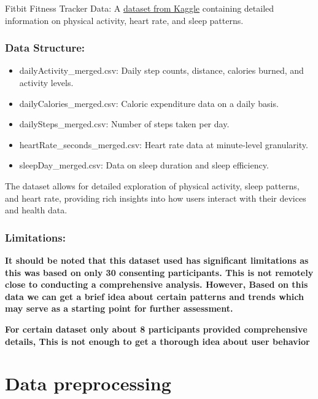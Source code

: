 \documentclass[
]{article}
\providecommand{\tightlist}{%
  \setlength{\itemsep}{0pt}\setlength{\parskip}{0pt}}
\begin{document}
Fitbit Fitness Tracker Data: A
\href{https://www.kaggle.com/datasets/arashnic/fitbit}{dataset from
Kaggle} containing detailed information on physical activity, heart
rate, and sleep patterns.

\hypertarget{data-structure}{%
\subsubsection{Data Structure:}\label{data-structure}}

\begin{itemize}
\tightlist
\item
  dailyActivity\_merged.csv: Daily step counts, distance, calories
  burned, and activity levels.
\item
  dailyCalories\_merged.csv: Caloric expenditure data on a daily basis.
\item
  dailySteps\_merged.csv: Number of steps taken per day.
\item
  heartRate\_seconds\_merged.csv: Heart rate data at minute-level
  granularity.
\item
  sleepDay\_merged.csv: Data on sleep duration and sleep efficiency.
\end{itemize}

The dataset allows for detailed exploration of physical activity, sleep
patterns, and heart rate, providing rich insights into how users
interact with their devices and health data.

\hypertarget{limitations}{%
\subsubsection{Limitations:}\label{limitations}}

\textbf{It should be noted that this dataset used has significant
limitations as this was based on only 30 consenting participants. This
is not remotely close to conducting a comprehensive analysis. However,
Based on this data we can get a brief idea about certain patterns and
trends which may serve as a starting point for further assessment.}

\textbf{For certain dataset only about 8 participants provided
comprehensive details, This is not enough to get a thorough idea about
user behavior}

\hypertarget{data-preprocessing}{%
\section{Data preprocessing}\label{data-preprocessing}}
\end{document}
